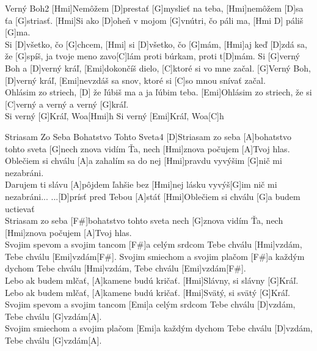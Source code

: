 \documentclass[12pt]{article}
\begin{document}
\begin{song}{Verný Boh}{2}
	[Hmi]Nemôžem [D]prestať [G]myslieť na teba,
	[Hmi]nemôžem [D]sa ťa [G]striasť.
	[Hmi]Si ako [D]oheň v mojom [G]vnútri, čo páli ma,
	[Hmi D] páliš [G]ma.
	\\
	[Hmi] Si [D]všetko, čo [G]chcem,
	[Hmi] si [D]všetko, čo [G]mám,
	[Hmi]aj keď [D]zdá sa, že [G]spíš, 
	ja tvoje meno zavo[C]lám
	proti búrkam, proti t[D]mám.
	\columnbreak
	Si [G]verný Boh a [D]verný kráľ,
	[Emi]dokončíš dielo, [C]ktoré si vo mne začal.
	[G]Verný Boh, [D]verný kráľ, [Emi]nevzdáš sa snov, 
	ktoré si [C]so mnou snívať začal.
	\\
	[G]Ohlásim zo striech,
	[D] že ľúbiš ma a ja ľúbim teba.
	[Emi]Ohlásim zo striech,
	že si [C]verný a verný a verný [G]kráľ.
	\\
	Si verný [G]Kráľ, Woa[Hmi]h
	Si verný [Emi]Kráľ, Woa[C]h
\end{song}

\begin{song}{Striasam Zo Seba Bohatstvo Tohto Sveta}{4}
	[D]Striasam zo seba
	[A]bohatstvo tohto sveta
	[G]nech znova vidím Ťa,
	nech [Hmi]znova počujem 
	[A]Tvoj hlas.
	\\
	[D]Oblečiem si chválu
	[A]a zahalím sa do nej
	[Hmi]pravdu vyvýšim
	[G]nič mi nezabráni.
	\\
	[D]Darujem ti slávu
	[A]pôjdem ľahšie bez 
	[Hmi]nej
	lásku vyvýš[G]im
	nič mi nezabráni...
	\columnbreak
	...[D]prísť
	pred Tebou [A]stáť
	[Hmi]Oblečiem si chválu
	[G]a budem uctievať
	\\
	[D]Striasam zo seba
	[F#]bohatstvo tohto sveta
	nech [G]znova vidím Ťa,
	nech [Hmi]znova počujem 
	[A]Tvoj hlas.
	\\
	[D]Svojim spevom 
	a svojim tancom
	[F#]a celým srdcom
	Tebe chválu [Hmi]vzdám,
	Tebe chválu [Emi]vzdám[F#].
	\columnbreak
	[D]Svojim smiechom 
	a svojim plačom
	[F#]a každým dychom
	Tebe chválu [Hmi]vzdám,
	Tebe chválu [Emi]vzdám[F#].
	\\
	[D]Lebo ak budem
	mlčať,
	[A]kamene budú kričať.
	[Hmi]Slávny, si slávny 
	[G]Kráľ.
	\\
	[D]Lebo ak budem
	mlčať,
	[A]kamene budú kričať.
	[Hmi]Svätý, si svätý [G]Kráľ.
	\columnbreak
	[D]Svojim spevom 
	a svojim tancom
	[Emi]a celým srdcom
	Tebe chválu [D]vzdám,
	Tebe chválu [G]vzdám[A].
	\\
	[D]Svojim smiechom 
	a svojim plačom
	[Emi]a každým dychom
	Tebe chválu [D]vzdám,
	Tebe chválu [G]vzdám[A].
\end{song}
\end{document}
